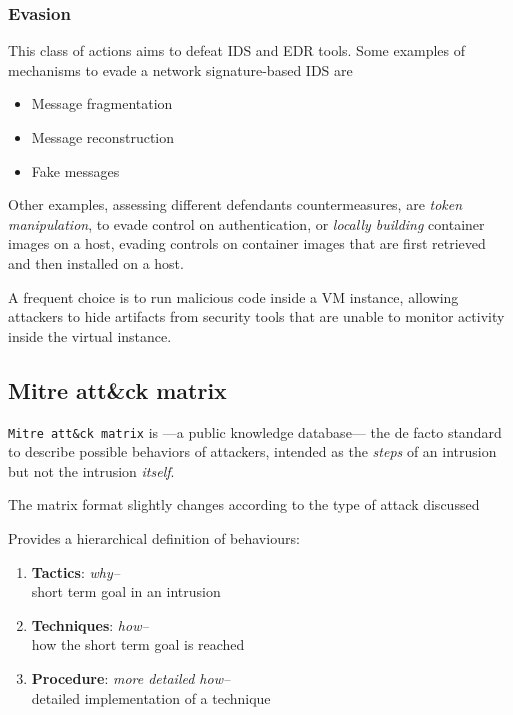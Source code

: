 \subsubsection{Evasion}
This class of actions aims to defeat IDS and EDR tools.
Some examples of mechanisms to evade a network signature-based IDS are
\begin{itemize}
   \item Message fragmentation
   \item Message reconstruction
   \item Fake messages
\end{itemize}

Other examples, assessing different defendants countermeasures, are
\textit{token manipulation}, to evade control on authentication, or 
\textit{locally building} container images on a host, evading controls on container images that are first retrieved and then installed on a host.

A frequent choice is to run malicious code inside a VM 
instance, allowing attackers to hide artifacts from security tools that are unable to
monitor activity inside the virtual instance.


\subsection{Mitre att\&ck matrix}

\texttt{Mitre att\&ck matrix} is {---}a public knowledge database{---} the de facto standard to describe possible behaviors of attackers,
intended as
the \textit{steps} of an intrusion but not the intrusion \textit{itself}.

The matrix format slightly changes according to the type of attack discussed


Provides a hierarchical definition of behaviours:
\begin{enumerate}
   \item \textbf{Tactics}: \textit{\color{gray}{--}why{--}}\\
   short term goal in an intrusion 
   \item \textbf{Techniques}:  \textit{\color{gray}{--}how{--}}\\
   how the short term goal is reached 
   \item \textbf{Procedure}:  \textit{\color{gray}{--}more detailed how{--}}\\
   detailed implementation of a technique 
\end{enumerate}


